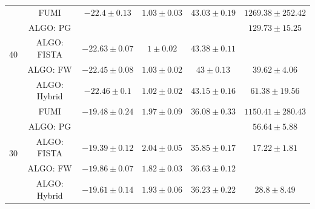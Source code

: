 \begin{table}[h]
{\begin{threeparttable}
\begin{tabular}{|c|c|c|c|c|c|}
\multirow{5}{*}{40} & FUMI                   &                    {$-22.4\pm 0.13$}  &                    {$1.03\pm 0.03$} &                    {$43.03\pm 0.19$} &                    {$1269.38\pm 252.42$} \tabularnewline
                    & ALGO: PG               & \cellcolor{red! 10}{$-23.38\pm 0.02$} & \cellcolor{red! 10}{$0.84\pm 0$}    & \cellcolor{red! 10}{$44.77\pm 0.04$} &                    {$129.73\pm 15.25$}   \tabularnewline
                    & ALGO: FISTA            &                    {$-22.63\pm 0.07$} &                    {$1\pm 0.02$}    &                    {$43.38\pm 0.11$} & \cellcolor{red! 10}{$26.3\pm 2.98$}      \tabularnewline
                    & ALGO: FW               &                    {$-22.45\pm 0.08$} &                    {$1.03\pm 0.02$} &                    {$43\pm 0.13$}    &                    {$39.62\pm 4.06$}     \tabularnewline
                    & ALGO: Hybrid \tnote{1} &                    {$-22.46\pm 0.1$}  &                    {$1.02\pm 0.02$} &                    {$43.15\pm 0.16$} &                    {$61.38\pm 19.56$}    \tabularnewline \hline \hline
\multirow{5}{*}{30} & FUMI                   &                    {$-19.48\pm 0.24$} &                    {$1.97\pm 0.09$} &                    {$36.08\pm 0.33$} &                    {$1150.41\pm 280.43$} \tabularnewline
                    & ALGO: PG               & \cellcolor{red! 10}{$-20.57\pm 0.04$} & \cellcolor{red! 10}{$1.51\pm 0.01$} & \cellcolor{red! 10}{$38.03\pm 0.07$} &                    {$56.64\pm 5.88$}     \tabularnewline
                    & ALGO: FISTA            &                    {$-19.39\pm 0.12$} &                    {$2.04\pm 0.05$} &                    {$35.85\pm 0.17$} &                    {$17.22\pm 1.81$}     \tabularnewline
                    & ALGO: FW               &                    {$-19.86\pm 0.07$} &                    {$1.82\pm 0.03$} &                    {$36.63\pm 0.12$} & \cellcolor{red! 10}{$14.2\pm 1.4$}       \tabularnewline
                    & ALGO: Hybrid \tnote{1} &                    {$-19.61\pm 0.14$} &                    {$1.93\pm 0.06$} &                    {$36.23\pm 0.22$} &                    {$28.8\pm 8.49$}      \tabularnewline \hline \hline

\end{tabular}
\end{threeparttable}}
\end{table}
